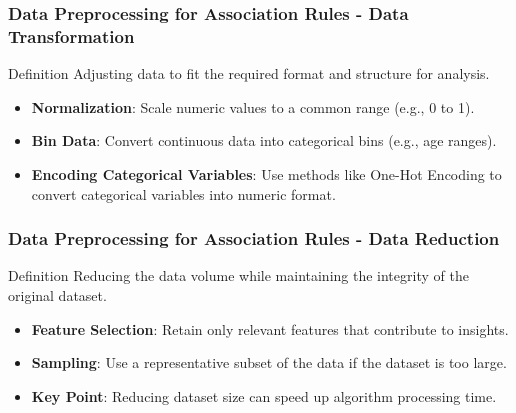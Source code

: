 \documentclass{beamer}
\begin{document}
\begin{frame}[fragile]
    \frametitle{Data Preprocessing for Association Rules - Data Transformation}
    \begin{block}{Definition}
        Adjusting data to fit the required format and structure for analysis.
    \end{block}

    \begin{itemize}
        \item \textbf{Normalization}: Scale numeric values to a common range (e.g., 0 to 1).
        \item \textbf{Bin Data}: Convert continuous data into categorical bins (e.g., age ranges).
        \item \textbf{Encoding Categorical Variables}: Use methods like One-Hot Encoding to convert categorical variables into numeric format.
    \end{itemize}
\end{frame}

\begin{frame}[fragile]
    \frametitle{Data Preprocessing for Association Rules - Data Reduction}
    \begin{block}{Definition}
        Reducing the data volume while maintaining the integrity of the original dataset.
    \end{block}

    \begin{itemize}
        \item \textbf{Feature Selection}: Retain only relevant features that contribute to insights.
        \item \textbf{Sampling}: Use a representative subset of the data if the dataset is too large.
        \item \textbf{Key Point}: Reducing dataset size can speed up algorithm processing time.
    \end{itemize}
\end{frame}
\end{document}
